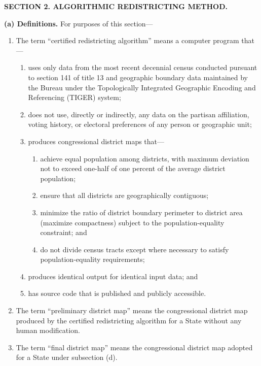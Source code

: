 \bigskip

\noindent\textbf{SECTION 2. ALGORITHMIC REDISTRICTING METHOD.}

\textbf{(a) Definitions.} For purposes of this section---

\begin{enumerate}[label=(\arabic*)]
    \item The term ``certified redistricting algorithm'' means a computer program that---
    \begin{enumerate}[label=(\Alph*)]
        \item uses only data from the most recent decennial census conducted pursuant to section 141 of title 13 and geographic boundary data maintained by the Bureau under the Topologically Integrated Geographic Encoding and Referencing (TIGER) system;
        \item does not use, directly or indirectly, any data on the partisan affiliation, voting history, or electoral preferences of any person or geographic unit;
        \item produces congressional district maps that---
        \begin{enumerate}[label=(\roman*)]
            \item achieve equal population among districts, with maximum deviation not to exceed one-half of one percent of the average district population;
            \item ensure that all districts are geographically contiguous;
            \item minimize the ratio of district boundary perimeter to district area (maximize compactness) subject to the population-equality constraint; and
            \item do not divide census tracts except where necessary to satisfy population-equality requirements;
        \end{enumerate}
        \item produces identical output for identical input data; and
        \item has source code that is published and publicly accessible.
    \end{enumerate}

    \item The term ``preliminary district map'' means the congressional district map produced by the certified redistricting algorithm for a State without any human modification.

    \item The term ``final district map'' means the congressional district map adopted for a State under subsection (d).
\end{enumerate}


